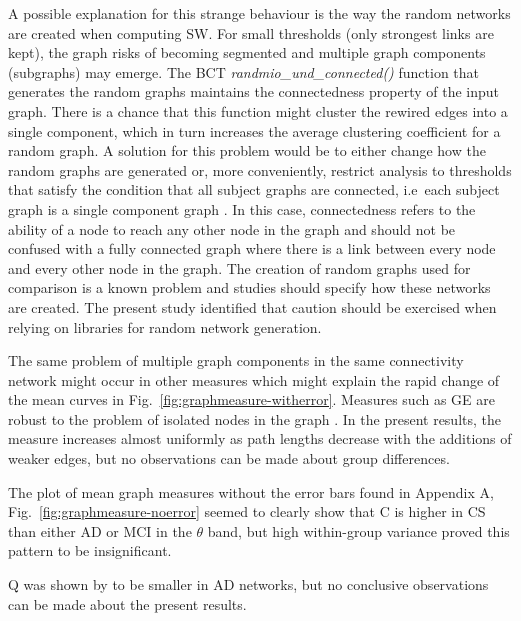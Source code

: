 A possible explanation for this strange behaviour is the way the random networks are created when computing \ac{SW}. For small thresholds (only strongest links are kept), the graph risks of becoming segmented and multiple graph components (subgraphs) may emerge. The \ac{BCT} \textit{randmio_und_connected()} function that generates the random graphs maintains the connectedness property of the input graph. There is a chance that this function might cluster the rewired edges into a single component, which in turn increases the average clustering coefficient for a random graph. A solution for this problem would be to either change how the random graphs are generated or, more conveniently, restrict analysis to thresholds that satisfy the condition that all subject graphs are connected, i.e\ each subject graph is a single component graph \autocite{Rudie2012}. In this case, connectedness refers to the ability of a node to reach any other node in the graph and should not be confused with a fully connected graph where there is a link between every node and every other node in the graph. 
The creation of random graphs used for comparison is a known problem \autocite{Tijms2013} and studies should specify how these networks are created. The present study identified that caution should be exercised when relying on libraries for random network generation. 

The same problem of multiple graph components in the same connectivity network might occur in other measures which might explain the rapid change of the mean curves in Fig.~\ref{fig:graphmeasure-witherror}. Measures such as \ac{GE} are robust to the problem of isolated nodes in the graph \autocite{Latora2001,Fallani2014}. In the present results, the measure increases almost uniformly as path lengths decrease with the additions of weaker edges, but no observations can be made about group differences. 

The plot of mean graph measures without the error bars found in Appendix A, Fig.~\ref{fig:graphmeasure-noerror} seemed to clearly show that \ac{C} is higher in \ac{CS} than either \ac{AD} or \ac{MCI} in the \(\theta\) band, but high within-group variance proved this pattern to be insignificant. 

\ac{Q} was shown by \textcite{DeHaan2012b} to be smaller in \ac{AD} networks, but no conclusive observations can be made about the present results.


